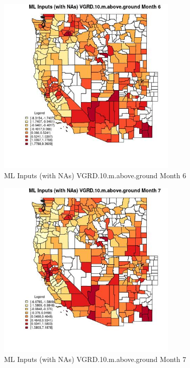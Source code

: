 \begin{figure} 
\centering  
\includegraphics[width=0.77\textwidth]{Code_Outputs/Report_ML_input_PM25_Step4_part_f_de_duplicated_aves_prioritize_24hr_obswNAs_CountyVGRD10mabovegroundmedianMonth6.jpg} 
\caption{\label{fig:Report_ML_input_PM25_Step4_part_f_de_duplicated_aves_prioritize_24hr_obswNAsCountyVGRD10mabovegroundmedianMonth6}ML Inputs (with NAs) VGRD.10.m.above.ground Month 6} 
\end{figure} 
 

\begin{figure} 
\centering  
\includegraphics[width=0.77\textwidth]{Code_Outputs/Report_ML_input_PM25_Step4_part_f_de_duplicated_aves_prioritize_24hr_obswNAs_CountyVGRD10mabovegroundmedianMonth7.jpg} 
\caption{\label{fig:Report_ML_input_PM25_Step4_part_f_de_duplicated_aves_prioritize_24hr_obswNAsCountyVGRD10mabovegroundmedianMonth7}ML Inputs (with NAs) VGRD.10.m.above.ground Month 7} 
\end{figure} 
 

